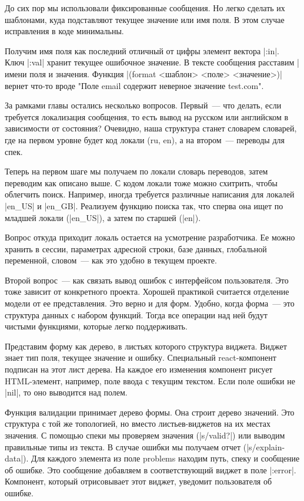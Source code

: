До сих пор мы использовали фиксированные сообщения. Но легко сделать их
шаблонами, куда подставляют текущее значение или имя поля. В этом случае
исправления в коде минимальны.

Получим имя поля как последний отличный от цифры элемент вектора \spverb|:in|. Ключ
\spverb|:val| хранит текущее ошибочное значение. В тексте сообщения расставим \spverb|%
имени поля и значения. Функция \spverb|(format <шаблон> <поле> <значение>)| вернет
что-то вроде "Поле email содержит неверное значение test.com".

За рамками главы остались несколько вопросов. Первый~--- что делать, если
требуется локализация сообщения, то есть вывод на русском или английском в
зависимости от состояния? Очевидно, наша структура станет словарем словарей, где
на первом уровне будет код локали (ru, en), а на втором~--- переводы для спек.

Теперь на первом шаге мы получаем по локали словарь переводов, затем переводим
как описано выше. С кодом локали тоже можно схитрить, чтобы облегчить
поиск. Например, иногда требуется различные написания для локалей \spverb|en_US| и
\spverb|en_GB|. Реализуем функцию поиска так, что сперва она ищет по младшей локали
(\spverb|en_US|), а затем по старшей (\spverb|en|).

Вопрос откуда приходит локаль остается на усмотрение разработчика. Ее можно
хранить в сессии, параметрах адресной строки, базе данных, глобальной
переменной, словом~--- как это удобно в текущем проекте.

Второй вопрос~--- как связать вывод ошибок с интерфейсом пользователя. Это тоже
зависит от конкретного проекта. Хорошей практикой считается отделение модели от
ее представления. Это верно и для форм. Удобно, когда форма~--- это структура
данных с набором функций. Тогда все операции над ней будут чистыми функциями,
которые легко поддерживать.

Представим форму как дерево, в листьях которого структура виджета. Виджет знает
тип поля, текущее значение и ошибку. Специальный react-компонент подписан на
этот лист дерева. На каждое его изменения компонент рисует HTML-элемент,
например, поле ввода с текущим текстом. Если поле ошибки не \spverb|nil|, то оно
выводится над полем.

Функция валидации принимает дерево формы. Она строит дерево значений. Это
структура с той же топологией, но вместо листьев-виджетов на их местах
значения. С помощью спеки мы проверяем значения (\spverb|s/valid?|) или выводим
правильные типы из текста. В случае ошибки мы получаем отчет
(\spverb|s/explain-data|). Для каждого элемента из поле problems находим путь, спеку и
сообщение об ошибке. Это сообщение добавляем в соответствующий виджет в поле
\spverb|:error|. Компонент, который отрисовывает этот виджет, уведомит пользователя об
ошибке.

